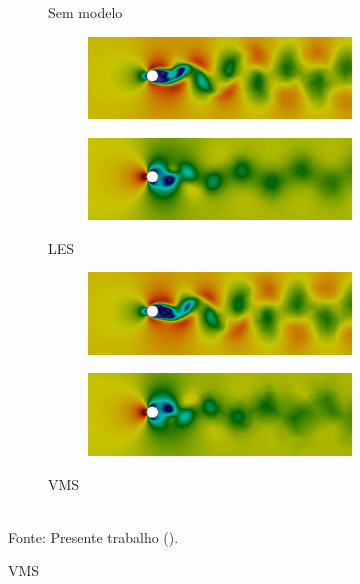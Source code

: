 \begin{figure}[h!]
\begin{subfigure}{\textwidth}
\begin{subfigure}{.49\textwidth}
        \end{subfigure}
        \caption{Sem modelo}
    \end{subfigure}
    \begin{subfigure}{\textwidth}\centering
        \begin{subfigure}{.49\textwidth}
            \includegraphics[width=\linewidth]{Figuras/cylinder/analise2/LES-TH-u.png}
        \end{subfigure}
        \begin{subfigure}{.49\textwidth}
            \includegraphics[width=\linewidth]{Figuras/cylinder/analise2/LES-TH-p.png}
        \end{subfigure}
        \caption{LES}
    \end{subfigure}
    \begin{subfigure}{\textwidth}\centering
        \begin{subfigure}{.49\textwidth}
            \includegraphics[width=\linewidth]{Figuras/cylinder/analise2/VMS-TH-u.png}
        \end{subfigure}
        \begin{subfigure}{.49\textwidth}
            \includegraphics[width=\linewidth]{Figuras/cylinder/analise2/VMS-TH-p.png}
        \end{subfigure}
        \caption{VMS}
    \end{subfigure}
    \\Fonte: Presente trabalho (\the\year).
    \label{fig:vel-pre-TH}
\end{figure}